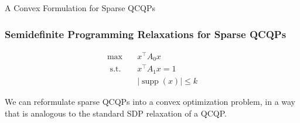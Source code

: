 \documentclass{beamer}
\DeclareMathOperator*{\supp}{supp}
\newcommand{\st}{{\text{ s.t. }}}
\begin{document}
%
\begin{frame}
    \centering
    \huge
    {\color{gray}A Convex Formulation for Sparse QCQPs}
\end{frame}
\begin{frame}
\frametitle{Semidefinite Programming Relaxations for Sparse QCQPs}
    \begin{equation*}
        \begin{aligned}
            \max\quad & x^{\intercal}A_0x\\
            \st & x^{\intercal}A_1x = 1\\
                &|\supp(x)| \le k
        \end{aligned}
    \end{equation*}

    We can reformulate sparse QCQPs into a convex optimization problem, in a way that is analogous to the standard SDP relaxation of a QCQP.
\end{frame}
\end{document}
